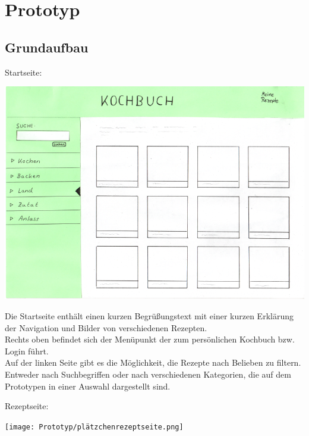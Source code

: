 \documentclass[parskip,10pt,abstracton]{scrartcl}
\begin{document}
\pagebreak
\section{Prototyp}


\subsection*{Grundaufbau}

Startseite:
\begin{center}
\includegraphics[scale=0.4]{Prototyp/home.png}
\end{center}

Die Startseite enthält einen kurzen Begrüßungstext mit einer kurzen Erklärung der Navigation und Bilder von verschiedenen Rezepten.\\
Rechts oben befindet sich der Menüpunkt der zum persönlichen Kochbuch bzw. Login führt.\\
Auf der linken Seite gibt es die Möglichkeit, die Rezepte nach Belieben zu filtern. Entweder nach Suchbegriffen oder nach verschiedenen Kategorien, die auf dem Prototypen in einer Auswahl dargestellt sind.

\pagebreak
Rezeptseite:
\begin{center}
\texttt{[image: Prototyp/plätzchenrezeptseite.png]}
\end{center}
\end{document}
